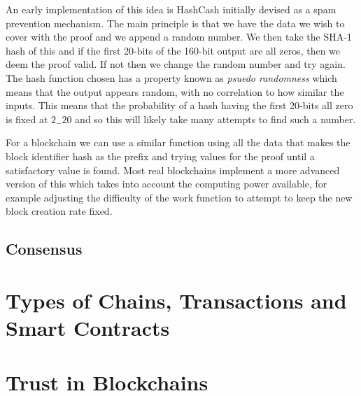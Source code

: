 An early implementation of this idea is HashCash  initially devised as a spam prevention mechanism. The main principle is that we have the data we wish to cover with the proof and we append a random number. We then take the SHA-1 hash of this and if the first 20-bits of the 160-bit output are all zeros, then we deem the proof valid. If not then we change the random number and try again. The hash function chosen has a property known as \emph{psuedo randomness} which means that the output appears random, with no correlation to how similar the inputs. This means that the probability of a hash having the first 20-bits all zero is fixed at $2_-20$ and so this will likely take many attempts to find such a number.

For a blockchain we can use a similar function using all the data that makes the block identifier hash as the prefix and trying values for the proof until a satisfactory value is found. Most real blockchains implement a more advanced version of this which takes into account the computing power available, for example adjusting the difficulty of the work function to attempt to keep the new block creation rate fixed.


\subsection{Consensus}
\label{ch:blockchain:structure:consensus}


\section{Types of Chains, Transactions and Smart Contracts}
\label{ch:blockchain:types}



\section{Trust in Blockchains}
\label{ch:blockchain:trust}

